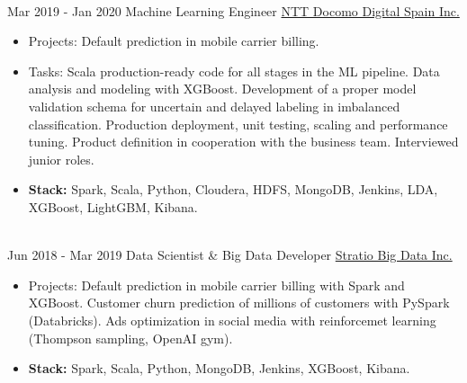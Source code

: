 \documentclass[letterpaper]{twentysecondcv} %
\begin{document}
\begin{twenty}
{\begin{itemize}
        \end{itemize}}
        \\
\twentyitem
    	{Mar 2019 - }
		{Jan 2020}
        {Machine Learning Engineer}
        {\href{https://www.docomodigital.com/}{NTT Docomo Digital Spain Inc.}}
        {}
        {\begin{itemize}
        \item Projects: Default prediction in mobile carrier billing. 
        \item Tasks: Scala production-ready code for all stages in the ML pipeline. Data analysis and modeling with XGBoost. Development of a proper model validation schema for uncertain and delayed labeling in imbalanced classification. Production deployment, unit testing, scaling and performance tuning. Product definition in cooperation with the business team. Interviewed junior roles.
        \item \textbf{Stack:} Spark, Scala, Python, Cloudera, HDFS, MongoDB, Jenkins, LDA, XGBoost, LightGBM, Kibana.
        \end{itemize}}
        \\
\twentyitem
    	{Jun 2018 -}
		{Mar 2019}
        {Data Scientist \& Big Data Developer}
        {\href{http://www.stratio.com/}{Stratio Big Data Inc.}}
        {}
        {\begin{itemize}
        \item Projects: Default prediction in mobile carrier billing with Spark and XGBoost. Customer churn prediction of millions of customers with PySpark (Databricks). Ads optimization in social media with reinforcemet learning (Thompson sampling, OpenAI gym). 
        \item \textbf{Stack:} Spark, Scala, Python, MongoDB, Jenkins, XGBoost, Kibana. 
        \end{itemize}}
        \\     %

        

\end{twenty}
\end{document}
